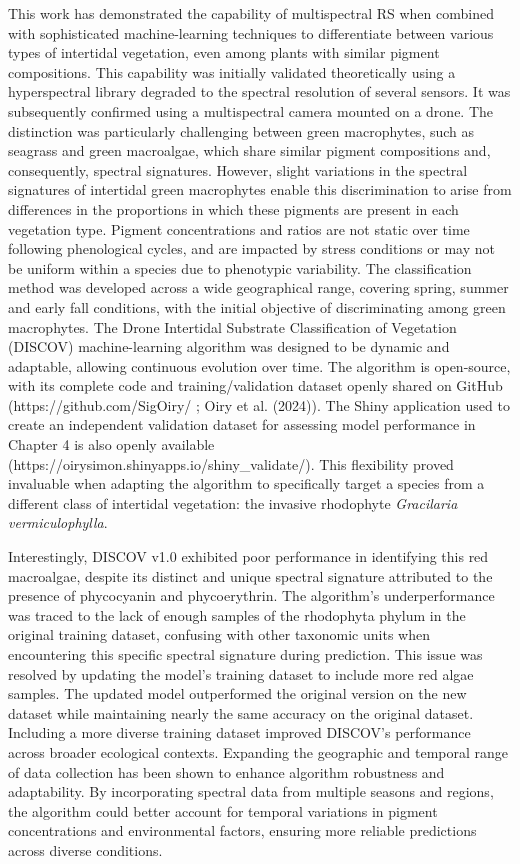 \documentclass[
  letterpaper,
  11pt,
  english,
  singlespacing,
  headsepline]{MastersDoctoralThesis}
\begin{document}
\begin{spacing}{1.5}
This work has demonstrated the capability of multispectral RS when
combined with sophisticated machine-learning techniques to differentiate
between various types of intertidal vegetation, even among plants with
similar pigment compositions. This capability was initially validated
theoretically using a hyperspectral library degraded to the spectral
resolution of several sensors. It was subsequently confirmed using a
multispectral camera mounted on a drone. The distinction was
particularly challenging between green macrophytes, such as seagrass and
green macroalgae, which share similar pigment compositions and,
consequently, spectral signatures. However, slight variations in the
spectral signatures of intertidal green macrophytes enable this
discrimination to arise from differences in the proportions in which
these pigments are present in each vegetation type. Pigment
concentrations and ratios are not static over time following
phenological cycles, and are impacted by stress conditions or may not be
uniform within a species due to phenotypic variability. The
classification method was developed across a wide geographical range,
covering spring, summer and early fall conditions, with the initial
objective of discriminating among green macrophytes. The Drone
Intertidal Substrate Classification of Vegetation (DISCOV)
machine-learning algorithm was designed to be dynamic and adaptable,
allowing continuous evolution over time. The algorithm is open-source,
with its complete code and training/validation dataset openly shared on
GitHub (https://github.com/SigOiry/ ; Oiry et al. (2024)). The Shiny
application used to create an independent validation dataset for
assessing model performance in Chapter 4 is also openly available
(https://oirysimon.shinyapps.io/shiny\_validate/). This flexibility
proved invaluable when adapting the algorithm to specifically target a
species from a different class of intertidal vegetation: the invasive
rhodophyte \emph{Gracilaria vermiculophylla}.

Interestingly, DISCOV v1.0 exhibited poor performance in identifying
this red macroalgae, despite its distinct and unique spectral signature
attributed to the presence of phycocyanin and phycoerythrin. The
algorithm's underperformance was traced to the lack of enough samples of
the rhodophyta phylum in the original training dataset, confusing with
other taxonomic units when encountering this specific spectral signature
during prediction. This issue was resolved by updating the model's
training dataset to include more red algae samples. The updated model
outperformed the original version on the new dataset while maintaining
nearly the same accuracy on the original dataset. Including a more
diverse training dataset improved DISCOV's performance across broader
ecological contexts. Expanding the geographic and temporal range of data
collection has been shown to enhance algorithm robustness and
adaptability. By incorporating spectral data from multiple seasons and
regions, the algorithm could better account for temporal variations in
pigment concentrations and environmental factors, ensuring more reliable
predictions across diverse conditions.


\end{spacing}
\end{document}
